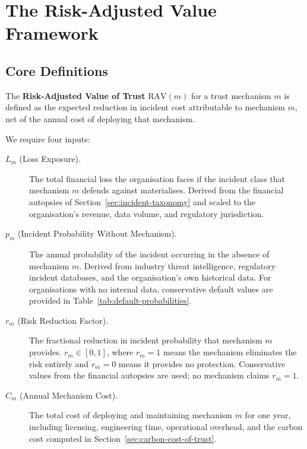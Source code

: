 \section{The Risk-Adjusted Value Framework}
\label{sec:rav-framework}

\subsection{Core Definitions}
\label{subsec:rav-definitions}

The \textbf{Risk-Adjusted Value of Trust} $\mathrm{RAV}(m)$ for
a trust mechanism $m$ is defined as the expected reduction in
incident cost attributable to mechanism $m$, net of the annual
cost of deploying that mechanism.

We require four inputs:

\begin{description}
  \item[$L_m$ (Loss Exposure).]
    The total financial loss the organisation faces if the
    incident class that mechanism $m$ defends against
    materialises.
    Derived from the financial autopsies of
    Section~\ref{sec:incident-taxonomy} and scaled to the
    organisation's revenue, data volume, and regulatory
    jurisdiction.

  \item[$p_m$ (Incident Probability Without Mechanism).]
    The annual probability of the incident occurring in the
    absence of mechanism $m$.
    Derived from industry threat intelligence, regulatory
    incident databases, and the organisation's own historical
    data.
    For organisations with no internal data, conservative
    default values are provided in
    Table~\ref{tab:default-probabilities}.

  \item[$r_m$ (Risk Reduction Factor).]
    The fractional reduction in incident probability that
    mechanism $m$ provides.
    $r_m \in [0, 1]$, where $r_m = 1$ means the mechanism
    eliminates the risk entirely and $r_m = 0$ means it
    provides no protection.
    Conservative values from the financial autopsies are used;
    no mechanism claims $r_m = 1$.

  \item[$C_m$ (Annual Mechanism Cost).]
    The total cost of deploying and maintaining mechanism $m$
    for one year, including licensing, engineering time,
    operational overhead, and the carbon cost computed in
    Section~\ref{sec:carbon-cost-of-trust}.
\end{description}

